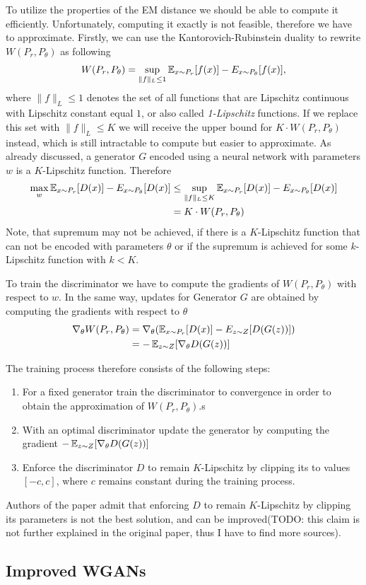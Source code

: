 To utilize the properties of the EM distance we should be able to compute it efficiently. Unfortunately, computing it exactly is not feasible, therefore we have to approximate. 
Firstly, we can use the Kantorovich-Rubinstein duality to rewrite $W(P_r, P_\theta)$ as following
\begin{equation}
	W(P_r, P_\theta) = \sup_{\lVert f \lVert_L \leq 1} \operatorname{\mathbb{E}}_{x \sim P_r}[f(x)] - E_{x \sim P_\theta} [f(x)],	
\end{equation}
where ${\lVert f \lVert_L \leq 1}$ denotes the set of all functions that are Lipschitz continuous with Lipschitz constant equal $1$, or also called \textit{1-Lipschitz} functions. If we replace this set with ${\lVert f \lVert_L \leq K}$ we will receive the upper bound for $K \cdot W(P_r, P_\theta)$ instead, which is still intractable to compute but easier to approximate. As already discussed, a generator $G$  encoded using a neural network with parameters $w$ is a $K$-Lipschitz function. Therefore
\begin{align*}
\max_w \operatorname{\mathbb{E}}_{x \sim P_r}[D(x)] - E_{x \sim P_\theta} [D(x)] &\leq \sup_{\lVert f \lVert_L \leq K} \operatorname{\mathbb{E}}_{x \sim P_r}[D(x)] - E_{x \sim P_\theta} [D(x)] \\
 &= K \cdot W(P_r, P_\theta)
\end{align*}
Note, that supremum may not be achieved, if there is a $K$-Lipschitz function that can not be encoded with parameters $\theta$ or if the supremum is achieved for some $k$-Lipschitz function with $k < K$.
 
To train the discriminator we have to compute the gradients of $W(P_r, P_\theta)$ with respect to $w$. In the same way, updates for Generator $G$ are obtained by computing the gradients with respect to $\theta$ 
\begin{align*}
\nabla_\theta W(P_r, P_\theta) &= \nabla_\theta(\operatorname{\mathbb{E}}_{x \sim P_r}[D(x)] - E_{z \sim Z} [D(G(z))]) \\
&= - \operatorname{\mathbb{E}}_{z \sim Z} [\nabla_\theta D(G(z))]
\end{align*}

The training process therefore consists of the following steps:
\begin{enumerate}
	\item For a fixed generator train the discriminator to convergence in order to obtain the approximation of $W(P_r, P_\theta)$.s
	\item With an optimal discriminator update the generator by computing the gradient $- \operatorname{\mathbb{E}}_{z \sim Z} [\nabla_\theta D(G(z))]$
	\item Enforce the discriminator $D$ to remain $K$-Lipschitz by clipping its to values $[-c, c]$, where $c$ remains constant during the training process. 
\end{enumerate}
Authors of the paper admit that enforcing $D$ to remain $K$-Lipschitz by clipping its parameters is not the best solution, and can be improved(TODO: this claim is not further explained in the original paper, thus I have to find more sources).
\subsection{Improved WGANs}





